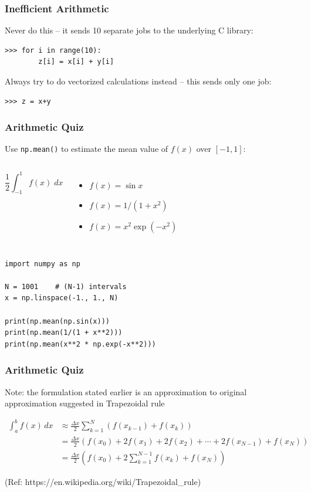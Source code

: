 \begin{frame}[fragile]
    \frametitle{Inefficient Arithmetic}

    Never do this -- it sends 10 separate jobs to the underlying C library:
    \begin{lstlisting}
>>> for i in range(10):
        z[i] = x[i] + y[i]
    \end{lstlisting}

    Always try to do vectorized calculations instead -- this sends only one job:
    \begin{lstlisting}
>>> z = x+y
    \end{lstlisting}
\end{frame}

\begin{frame}[fragile]\frametitle{Arithmetic Quiz}

    Use \lstinline|np.mean()| to estimate the mean value of $f(x)$ over $[-1,1]$:

    \begin{columns}
            \[ \frac{1}{2} \int_{-1}^{1} f(x) \; dx \]
            \begin{itemize}
                \item $f(x) = \sin x$
                \item $f(x) = 1/(1 + x^2)$
                \item $f(x) = x^2 \exp(-x^2)$
            \end{itemize}
    \end{columns}
    \begin{lstlisting}
import numpy as np

N = 1001    # (N-1) intervals
x = np.linspace(-1., 1., N)

print(np.mean(np.sin(x)))
print(np.mean(1/(1 + x**2)))
print(np.mean(x**2 * np.exp(-x**2)))
    \end{lstlisting}
	
\end{frame}

\begin{frame}[fragile]\frametitle{Arithmetic Quiz}

Note: the formulation stated earlier is an approximation to original approximation suggested in Trapezoidal rule

\begin{align*}
\int_{a}^{b} f(x)\, dx & \approx \frac{\Delta x}{2} \sum_{k=1}^{N} \left( f(x_{k-1}) + f(x_{k}) \right) \\
&= \frac{\Delta x}{2} ( f(x_0) + 2f(x_1) + 2f(x_2) + \dotsb + 2f(x_{N-1}) + f(x_N) )\\
&= \frac{\Delta x}{2} \left( f(x_0) + 2\sum_{k=1}^{N-1} f(x_k) + f(x_N) \right) 
\end{align*}

(Ref: https://en.wikipedia.org/wiki/Trapezoidal\_rule)
\end{frame}


